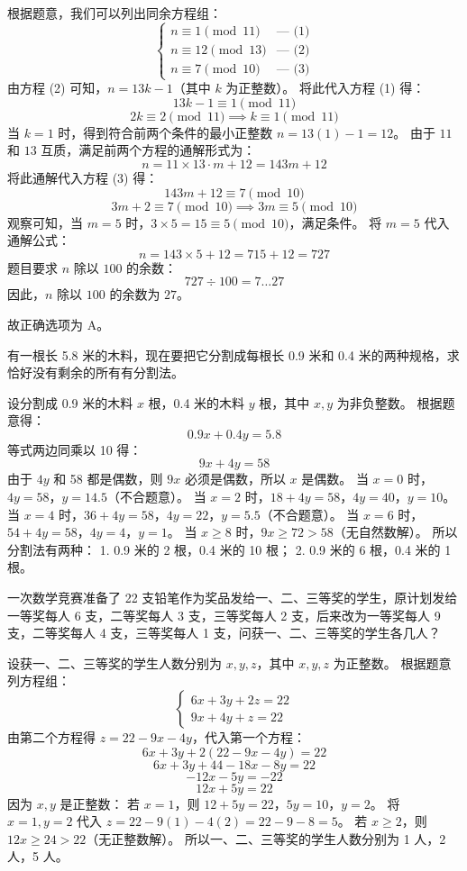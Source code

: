 \begin{questions}
\begin{solution}
根据题意，我们可以列出同余方程组：
\[
\begin{cases} 
n \equiv 1 \pmod{11} & \text{--- (1)} \\
n \equiv 12 \pmod{13} & \text{--- (2)} \\
n \equiv 7 \pmod{10} & \text{--- (3)}
\end{cases}
\]
由方程 (2) 可知，$n = 13k - 1$（其中 $k$ 为正整数）。
将此代入方程 (1) 得：
\[
13k - 1 \equiv 1 \pmod{11}
\]
\[
2k \equiv 2 \pmod{11} \implies k \equiv 1 \pmod{11}
\]
当 $k = 1$ 时，得到符合前两个条件的最小正整数 $n = 13(1) - 1 = 12$。
由于 $11$ 和 $13$ 互质，满足前两个方程的通解形式为：
\[
n = 11 \times 13 \cdot m + 12 = 143m + 12
\]
将此通解代入方程 (3) 得：
\[
143m + 12 \equiv 7 \pmod{10}
\]
\[
3m + 2 \equiv 7 \pmod{10} \implies 3m \equiv 5 \pmod{10}
\]
观察可知，当 $m = 5$ 时，$3 \times 5 = 15 \equiv 5 \pmod{10}$，满足条件。
将 $m = 5$ 代入通解公式：
\[
n = 143 \times 5 + 12 = 715 + 12 = 727
\]
题目要求 $n$ 除以 $100$ 的余数：
\[
727 \div 100 = 7 \dots 27
\]
因此，$n$ 除以 $100$ 的余数为 $27$。

故正确选项为 A。
\end{solution}

\question 有一根长 5.8 米的木料，现在要把它分割成每根长 0.9 米和 0.4 米的两种规格，求恰好没有剩余的所有有分割法。
\begin{solution}
设分割成 0.9 米的木料 $x$ 根，0.4 米的木料 $y$ 根，其中 $x, y$ 为非负整数。
根据题意得：
\[0.9x + 0.4y = 5.8\]
等式两边同乘以 10 得：
\[9x + 4y = 58\]
由于 $4y$ 和 58 都是偶数，则 $9x$ 必须是偶数，所以 $x$ 是偶数。
当 $x = 0$ 时，$4y = 58$，$y = 14.5$（不合题意）。
当 $x = 2$ 时，$18 + 4y = 58$，$4y = 40$，$y = 10$。
当 $x = 4$ 时，$36 + 4y = 58$，$4y = 22$，$y = 5.5$（不合题意）。
当 $x = 6$ 时，$54 + 4y = 58$，$4y = 4$，$y = 1$。
当 $x \ge 8$ 时，$9x \ge 72 > 58$（无自然数解）。
所以分割法有两种：
1. 0.9 米的 2 根，0.4 米的 10 根；
2. 0.9 米的 6 根，0.4 米的 1 根。
\end{solution}

\question 一次数学竞赛准备了 22 支铅笔作为奖品发给一、二、三等奖的学生，原计划发给一等奖每人 6 支，二等奖每人 3 支，三等奖每人 2 支，后来改为一等奖每人 9 支，二等奖每人 4 支，三等奖每人 1 支，问获一、二、三等奖的学生各几人？
\begin{solution}
设获一、二、三等奖的学生人数分别为 $x, y, z$，其中 $x, y, z$ 为正整数。
根据题意列方程组：
\[
\begin{cases}
6x + 3y + 2z = 22 \\
9x + 4y + z = 22
\end{cases}
\]
由第二个方程得 $z = 22 - 9x - 4y$，代入第一个方程：
\[6x + 3y + 2(22 - 9x - 4y) = 22\]
\[6x + 3y + 44 - 18x - 8y = 22\]
\[-12x - 5y = -22\]
\[12x + 5y = 22\]
因为 $x, y$ 是正整数：
若 $x = 1$，则 $12 + 5y = 22$，$5y = 10$，$y = 2$。
将 $x = 1, y = 2$ 代入 $z = 22 - 9(1) - 4(2) = 22 - 9 - 8 = 5$。
若 $x \ge 2$，则 $12x \ge 24 > 22$（无正整数解）。
所以一、二、三等奖的学生人数分别为 1 人，2 人，5 人。
\end{solution}


\end{questions}
